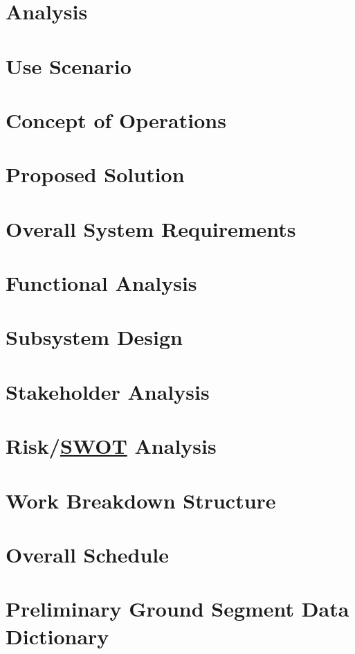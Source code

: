 \documentclass[12pt]{article}
\DeclareRobustCommand{\abbr}[1]{\texorpdfstring{\hyperlink{abbr:#1}{#1}}{#1}}
\numberwithin{figure}{section}
\numberwithin{table}{section}
\begin{document}
\newpage
\section{Analysis} %


\newpage
\section{Use Scenario} %


\newpage
\section{Concept of Operations} %


\newpage
\section{Proposed Solution} %


\newpage
\section{Overall System Requirements} %


\newpage
\section{Functional Analysis} %


\newpage
\section{Subsystem Design} %


% 

\newpage
\section{Stakeholder Analysis} %


\newpage
\section[Risk/SWOT Analysis]{Risk/\abbr{SWOT} Analysis} %


\newpage
\section{Work Breakdown Structure} %


\newpage
\section{Overall Schedule} %




\newpage
\section{Preliminary Ground Segment Data Dictionary}

\end{document}
